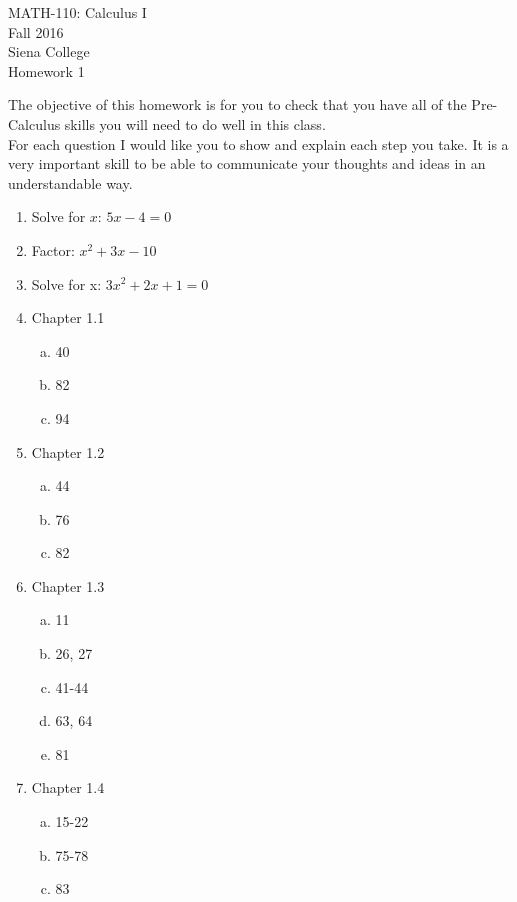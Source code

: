 \documentclass[11pt]{article}
\begin{document}
	\begin{center}
		MATH-110: Calculus I\\
		Fall 2016\\
		Siena College\\
		\vspace{.1in}
		Homework 1
	\end{center}
	
	The objective of this homework is for you to check that you have all of the Pre-Calculus skills you will need to do well in this class.\\
	
	For each question I would like you to show and explain each step you take.  It is a very important skill to be able to communicate your thoughts and ideas in an understandable way. 
	
	\begin{enumerate}
		\item Solve for $x$:  $5 x - 4 = 0$
		\item Factor:  $x^2+3 x-10$
		\item Solve for x:  $3 x^2 + 2x + 1 = 0$
		\item Chapter 1.1
		\begin{enumerate}[a)]
			\item 40
			\item 82
			\item 94
		\end{enumerate}
		\item Chapter 1.2
		\begin{enumerate}[a)]
			\item 44
			\item 76
			\item 82
		\end{enumerate}
		\item Chapter 1.3
		\begin{enumerate}[a)]
			\item 11
			\item 26, 27
			\item 41-44
			\item 63, 64
			\item 81
		\end{enumerate}
		\item Chapter 1.4
		\begin{enumerate}[a)]
			\item 15-22
			\item 75-78
			\item 83
		\end{enumerate}
	\end{enumerate}
	
\end{document}
